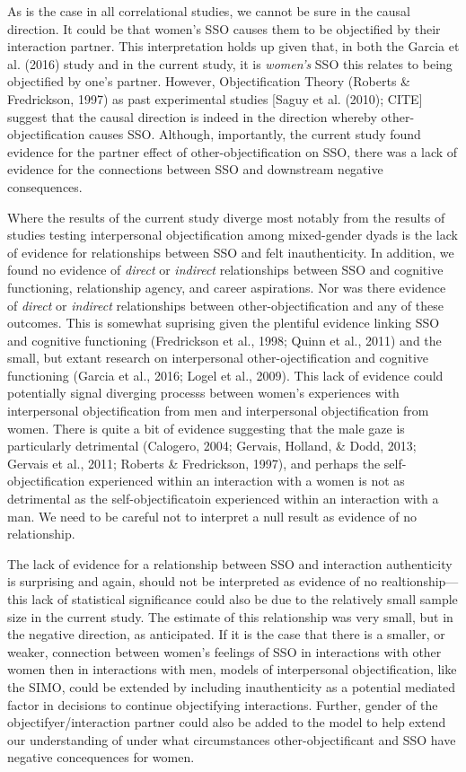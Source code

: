 \documentclass[
  man]{apa6}
\begin{document}
As is the case in all correlational studies, we cannot be sure in the causal direction. It could be that women's SSO causes them to be objectified by their interaction partner. This interpretation holds up given that, in both the Garcia et al. (2016) study and in the current study, it is \emph{women's} SSO this relates to being objectified by one's partner. However, Objectification Theory (Roberts \& Fredrickson, 1997) as past experimental studies {[}Saguy et al. (2010); CITE{]} suggest that the causal direction is indeed in the direction whereby other-objectification causes SSO. Although, importantly, the current study found evidence for the partner effect of other-objectification on SSO, there was a lack of evidence for the connections between SSO and downstream negative consequences.

Where the results of the current study diverge most notably from the results of studies testing interpersonal objectification among mixed-gender dyads is the lack of evidence for relationships between SSO and felt inauthenticity. In addition, we found no evidence of \emph{direct} or \emph{indirect} relationships between SSO and cognitive functioning, relationship agency, and career aspirations. Nor was there evidence of \emph{direct} or \emph{indirect} relationships between other-objectification and any of these outcomes. This is somewhat suprising given the plentiful evidence linking SSO and cognitive functioning (Fredrickson et al., 1998; Quinn et al., 2011) and the small, but extant research on interpersonal other-ojectification and cognitive functioning (Garcia et al., 2016; Logel et al., 2009). This lack of evidence could potentially signal diverging processs between women's experiences with interpersonal objectification from men and interpersonal objectification from women. There is quite a bit of evidence suggesting that the male gaze is particularly detrimental (Calogero, 2004; Gervais, Holland, \& Dodd, 2013; Gervais et al., 2011; Roberts \& Fredrickson, 1997), and perhaps the self-objectification experienced within an interaction with a women is not as detrimental as the self-objectificatoin experienced within an interaction with a man. We need to be careful not to interpret a null result as evidence of no relationship.

The lack of evidence for a relationship between SSO and interaction authenticity is surprising and again, should not be interpreted as evidence of no realtionship---this lack of statistical significance could also be due to the relatively small sample size in the current study. The estimate of this relationship was very small, but in the negative direction, as anticipated. If it is the case that there is a smaller, or weaker, connection between women's feelings of SSO in interactions with other women then in interactions with men, models of interpersonal objectification, like the SIMO, could be extended by including inauthenticity as a potential mediated factor in decisions to continue objectifying interactions. Further, gender of the objectifyer/interaction partner could also be added to the model to help extend our understanding of under what circumstances other-objectificant and SSO have negative concequences for women.
\end{document}
